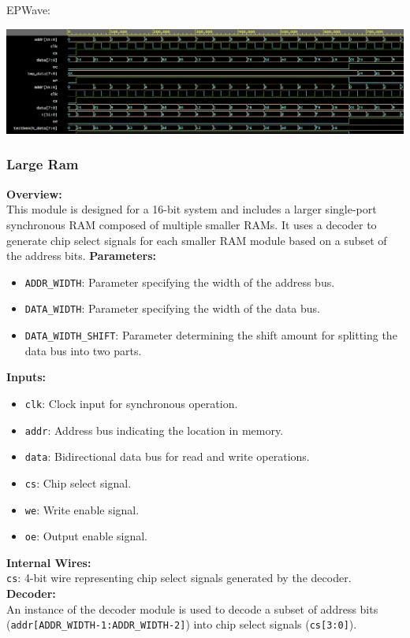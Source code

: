 \documentclass[12pt]{article}
\begin{document}
EPWave:
\begin{center}
    \includegraphics[width=\linewidth]{images/ram_tb_wave.png}
\end{center}
\newpage
\subsubsection{Large Ram}
\textbf{Overview:}\\
This module is designed for a 16-bit system and includes a larger single-port synchronous RAM composed of multiple smaller RAMs. It uses a decoder to generate chip select signals for each smaller RAM module based on a subset of the address bits.
\textbf{Parameters:}
\begin{itemize}
    \item \verb|ADDR_WIDTH|: Parameter specifying the width of the address bus.
    \item \verb|DATA_WIDTH|: Parameter specifying the width of the data bus.
    \item \verb|DATA_WIDTH_SHIFT|: Parameter determining the shift amount for splitting the data bus into two parts.
\end{itemize}
\textbf{Inputs:}
\begin{itemize}
    \item \verb|clk|: Clock input for synchronous operation.
    \item \verb|addr|: Address bus indicating the location in memory.
    \item \verb|data|: Bidirectional data bus for read and write operations.
    \item \verb|cs|: Chip select signal.
    \item \verb|we|: Write enable signal.
    \item \verb|oe|: Output enable signal.
\end{itemize}
\textbf{Internal Wires:}\\
\verb|cs|: 4-bit wire representing chip select signals generated by the decoder.\\
\textbf{Decoder:}\\
An instance of the decoder module is used to decode a subset of address bits (\verb|addr[ADDR_WIDTH-1:ADDR_WIDTH-2]|) into chip select signals (\verb|cs[3:0]|).\\
\end{document}

